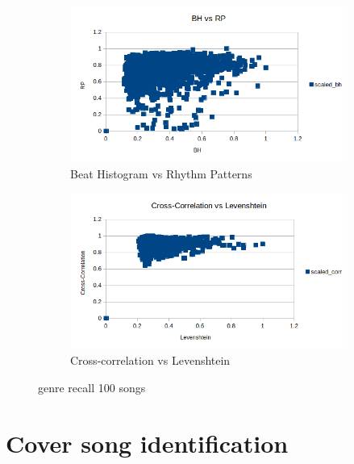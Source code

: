\begin{figure}[htbp]
{{			\begin{subfigure}{.495\textwidth}
				\centering    
				\includegraphics[scale=0.5]{Images/SparkFeat/BH_RP.png}
				\caption{Beat Histogram vs Rhythm Patterns}
				\label{fs3}
			\end{subfigure}
			\begin{subfigure}{.495\textwidth}
				\centering     
				\includegraphics[scale=0.5]{Images/SparkFeat/Cross-Corr_Levenshtein.png}
				\caption{Cross-correlation vs Levenshtein}
				\label{fs4}
			\end{subfigure}%
	}}
	\caption{genre recall 100 songs}
	\label{fig:featsep}
\end{figure}
\FloatBarrier

\section{Cover song identification}

